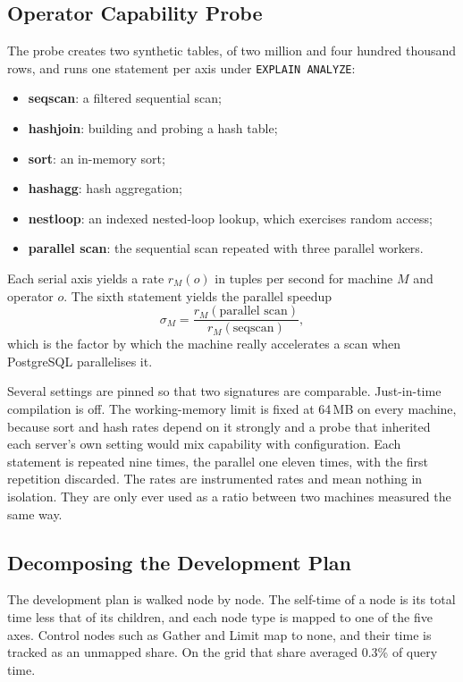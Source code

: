 \documentclass[runningheads]{llncs}
\begin{document}
\subsection{Operator Capability Probe}

The probe creates two synthetic tables, of two million and four hundred
thousand rows, and runs one statement per axis under \texttt{EXPLAIN ANALYZE}:
\begin{itemize}
\item \textbf{seqscan}: a filtered sequential scan;
\item \textbf{hashjoin}: building and probing a hash table;
\item \textbf{sort}: an in-memory sort;
\item \textbf{hashagg}: hash aggregation;
\item \textbf{nestloop}: an indexed nested-loop lookup, which exercises random
access;
\item \textbf{parallel scan}: the sequential scan repeated with three parallel
workers.
\end{itemize}
Each serial axis yields a rate $r_M(o)$ in tuples per second for machine $M$
and operator $o$. The sixth statement yields the parallel speedup
\begin{equation}
\sigma_M = \frac{r_M(\text{parallel scan})}{r_M(\text{seqscan})},
\end{equation}
which is the factor by which the machine really accelerates a scan when
PostgreSQL parallelises it.

Several settings are pinned so that two signatures are comparable. Just-in-time
compilation is off. The working-memory limit is fixed at 64\,MB on every
machine, because sort and hash rates depend on it strongly and a probe that
inherited each server's own setting would mix capability with configuration.
Each statement is repeated nine times, the parallel one eleven times, with
the first repetition discarded. The rates are instrumented rates and mean
nothing in isolation. They are only ever used as a ratio between two machines
measured the same way.

\subsection{Decomposing the Development Plan}

The development plan is walked node by node. The self-time of a node is its
total time less that of its children, and each node type is mapped to one of
the five axes. Control nodes such as Gather and Limit map to none, and their
time is tracked as an unmapped share. On the grid that share averaged 0.3\%
of query time.
\end{document}
